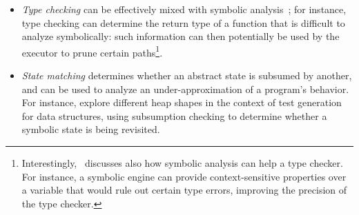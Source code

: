 \begin{itemize}
  \item {\em Type checking} can be effectively mixed with symbolic analysis~\cite{KCF-PLDI10};  for instance, type checking can determine the return type of a function that is difficult to analyze symbolically: such information can then potentially be used by the executor to prune certain paths\footnote{Interestingly,~\cite{KCF-PLDI10} discusses also how symbolic analysis can help a type checker. For instance, a symbolic engine can provide context-sensitive properties over a variable that would rule out certain type errors, improving the precision of the type checker.}.

  \item {\em State matching} determines whether an abstract state is subsumed by another, and can be used to analyze an under-approximation of a program's behavior. For instance, \cite{APV-SPIN06,VPP-ISSTA06} explore different heap shapes in the context of test generation for data structures, using subsumption checking to determine whether a symbolic state is being revisited. %

\end{itemize}

